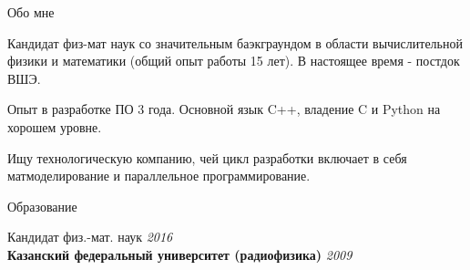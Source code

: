 \documentclass[
	a4paper, %
	11pt, %
]{resume} %
\begin{document}

\begin{rSection}{Обо мне}
	\item Кандидат физ-мат наук со значительным баэкграундом в области вычислительной физики и математики
	(общий опыт работы 15 лет). В настоящее время - постдок ВШЭ.
	\item Опыт в разработке ПО 3 года. Основной язык C++, владение C и
	Python на хорошем уровне.
	\item Ищу технологическую	компанию, чей цикл разработки включает в себя матмоделирование
	и параллельное программирование.
\end{rSection}

\begin{rSection}{Образование}

	Кандидат физ.-мат. наук \hfill \textit{2016} \\
	\textbf{Казанский федеральный университет (радиофизика)} \hfill \textit{2009} \\

\end{rSection}

\end{document}
